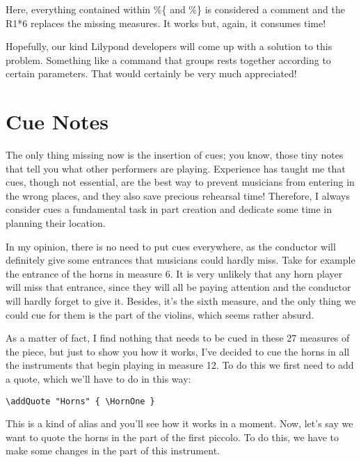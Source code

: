 \documentclass[../../LilyPond-Tutorials]{subfiles}
\begin{document}
Here, everything contained within \%\{ and \%\} is considered a comment and the R1*6 replaces the missing measures.
It works but, again, it consumes time!

Hopefully, our kind Lilypond developers will come up with a solution to this problem.
Something like a command that groups rests together according to certain parameters.
That would certainly be very much appreciated!


\section{Cue Notes}
The only thing missing now is the insertion of cues; you know, those tiny notes that tell you what other performers are playing.
Experience has taught me that cues, though not essential, are the best way to prevent musicians from entering in the wrong places, and they also save precious rehearsal time!
Therefore, I always consider cues a fundamental task in part creation and dedicate some time in planning their location.

In my opinion, there is no need to put cues everywhere, as the conductor will definitely give some entrances that musicians could hardly miss.
Take for example the entrance of the horns in measure 6.
It is very unlikely that any horn player will miss that entrance, since they will all be paying attention and the conductor will hardly forget to give it.
Besides, it's the sixth measure, and the only thing we could cue for them is the part of the violins, which seems rather absurd.

As a matter of fact, I find nothing that needs to be cued in these 27 measures of the piece, but just to show you how it works, I've decided to cue the horns in all the instruments that begin playing in measure 12.
To do this we first need to add a quote, which we'll have to do in this way:

\verb|\addQuote "Horns" { \HornOne }|

This is a kind of alias and you'll see how it works in a moment.
Now, let's say we want to quote the horns in the part of the first piccolo.
To do this, we have to make some changes in the part of this instrument.
\end{document}
